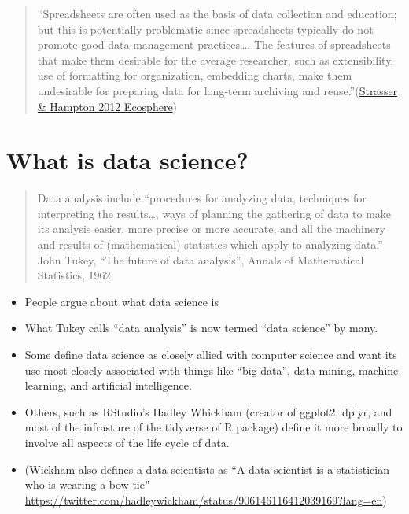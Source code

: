 \documentclass[
]{book}
\providecommand{\tightlist}{%
  \setlength{\itemsep}{0pt}\setlength{\parskip}{0pt}}
\begin{document}
\begin{quote}
``Spreadsheets are often used as the basis of data collection and education; but this is potentially problematic since spreadsheets typically do not promote good data management practices\ldots. The features of spreadsheets that make them desirable for the average researcher, such as extensibility, use of formatting for organization, embedding charts, make them undesirable for preparing data for long‐term archiving and reuse.''(\href{https://esajournals.onlinelibrary.wiley.com/doi/abs/10.1890/ES12-00139.1}{Strasser \& Hampton 2012 Ecosphere})
\end{quote}

\hypertarget{what-is-data-science}{%
\section{What is data science?}\label{what-is-data-science}}

\begin{quote}
Data analysis include ``procedures for analyzing data, techniques for interpreting the results\ldots, ways of planning the gathering of data to make its analysis easier, more precise or more accurate, and all the machinery and results of (mathematical) statistics which apply to analyzing data.'' John Tukey, ``The future of data analysis'', Annals of Mathematical Statistics, 1962.
\end{quote}

\begin{itemize}
\tightlist
\item
  People argue about what data science is
\item
  What Tukey calls ``data analysis'' is now termed ``data science'' by many.\\
\item
  Some define data science as closely allied with computer science and want its use most closely associated with things like ``big data'', data mining, machine learning, and artificial intelligence.
\item
  Others, such as RStudio's Hadley Whickham (creator of ggplot2, dplyr, and most of the infrasture of the tidyverse of R package) define it more broadly to involve all aspects of the life cycle of data.
\item
  (Wickham also defines a data scientists as ``A data scientist is a statistician who is wearing a bow tie'' \url{https://twitter.com/hadleywickham/status/906146116412039169?lang=en})
\end{itemize}
\end{document}
